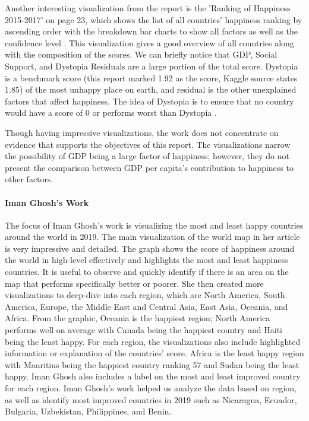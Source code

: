 \documentclass[11pt,twocolumn]{article}
\begin{document}
Another interesting visualization from the report is the 'Ranking of Happiness 2015-2017' on page 23, which shows the list of all countries' happiness ranking by ascending order with the breakdown bar charts to show all factors as well as the confidence level \cite{world-happiness-report-2018}. This visualization gives a good overview of all countries along with the composition of the scores. We can briefly notice that GDP, Social Support, and Dystopia Residuals are a large portion of the total score. Dystopia is a benchmark score (this report marked 1.92 as the score, Kaggle source states 1.85) of the most unhappy place on earth, and residual is the other unexplained factors that affect happiness. The idea of Dystopia is to ensure that no country would have a score of 0 or performs worst than Dystopia \cite{kaggle-dataset}. 

Though having impressive visualizations, the work does not concentrate on evidence that supports the objectives of this report. The visualizations narrow the possibility of GDP being a large factor of happiness; however, they do not present the comparison between GDP per capita's contribution to happiness to other factors.
   
\paragraph{Iman Ghosh's Work \cite{visual-capitalist}} The focus of Iman Ghosh's work is visualizing the most and least happy countries around the world in 2019. The main visualization of the world map in her article is very impressive and detailed. The graph shows the score of happiness around the world in high-level effectively and highlights the most and least happiness countries. It is useful to observe and quickly identify if there is an area on the map that performs specifically better or poorer. She then created more visualizations to deep-dive into each region, which are North America, South America, Europe, the Middle East and Central Asia, East Asia, Oceania, and Africa. From the graphic, Oceania is the happiest region; North America performs well on average with Canada being the happiest country and Haiti being the least happy. For each region, the visualizations also include highlighted information or explanation of the countries' score. Africa is the least happy region with Mauritius being the happiest country ranking 57 and Sudan being the least happy. Iman Ghosh also includes a label on the most and least improved country for each region. Iman Ghosh's work helped us analyze the data based on region, as well as identify most improved countries in 2019 such as Nicaragua, Ecuador, Bulgaria, Uzbekistan, Philippines, and Benin.
\end{document}
